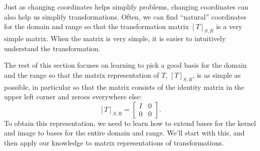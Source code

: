 
Just as changing coordinates helps simplify problems, changing coordinates can also help us simplify transformations.  Often, we can find ``natural'' coordinates for the domain and range so that the transformation matrix $[T]_{S,R}$ is a very simple matrix.  When the matrix is very simple, it is easier to intuitively understand the transformation.

The rest of this section focuses on learning to pick a good basis for the domain and the range so that the matrix representation of $T$, $[T]_{S,R}$, is as simple as possible, in particular so that the matrix consists of the identity matrix in the upper left corner and zeroes everywhere else:
$$[T]_{S,R}=\begin{bmatrix}I&0\\0&0\end{bmatrix}.$$
To obtain this representation, we need to learn how to extend bases for the kernel and image to bases for the entire domain and range.  We'll start with this, and then apply our knowledge to matrix representations of transformations.







